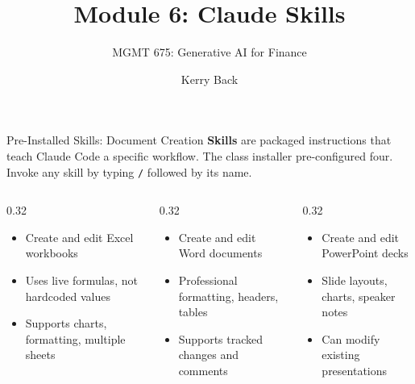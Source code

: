 \documentclass[aspectratio=169]{beamer}
\subtitle{MGMT 675: Generative AI for Finance}
\title{Module 6: Claude Skills}
\author{Kerry Back}
\date{}
\begin{document}
\maketitle

\begin{frame}{Pre-Installed Skills: Document Creation}
\textbf{Skills} are packaged instructions that teach Claude Code a specific workflow.  The class installer pre-configured four.  Invoke any skill by typing \texttt{/} followed by its name.
\vspace{0.3cm}
\begin{columns}[T]
\begin{column}{0.32\textwidth}
\begin{shadedbox}[title=\textbf{/xlsx}]
\begin{itemize}\footnotesize
  \item Create and edit Excel workbooks
  \item Uses \alert{live formulas}, not hardcoded values
  \item Supports charts, formatting, multiple sheets
\end{itemize}
\end{shadedbox}
\end{column}
\begin{column}{0.32\textwidth}
\begin{shadedbox}[title=\textbf{/docx}]
\begin{itemize}\footnotesize
  \item Create and edit Word documents
  \item Professional formatting, headers, tables
  \item Supports tracked changes and comments
\end{itemize}
\end{shadedbox}
\end{column}
\begin{column}{0.32\textwidth}
\begin{shadedbox}[title=\textbf{/pptx}]
\begin{itemize}\footnotesize
  \item Create and edit PowerPoint decks
  \item Slide layouts, charts, speaker notes
  \item Can modify existing presentations
\end{itemize}
\end{shadedbox}
\end{column}
\end{columns}
\end{frame}
\end{document}
